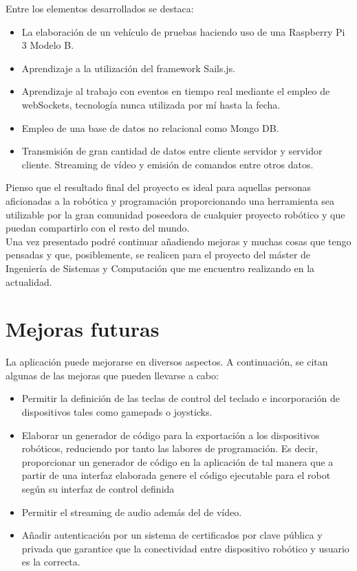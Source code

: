 Entre los elementos desarrollados se destaca:

\begin{itemize}
 \item La elaboración de un vehículo de pruebas haciendo uso de una Raspberry Pi 3 Modelo B.
 \item Aprendizaje a la utilización del framework Sails.js.
 \item Aprendizaje al trabajo con eventos en tiempo real mediante el empleo de webSockets, tecnología nunca utilizada por mí hasta la fecha.
 \item Empleo de una base de datos no relacional como Mongo DB.
 \item Transmisión de gran cantidad de datos entre cliente servidor y servidor cliente. Streaming de vídeo y emisión de comandos entre otros datos.\\
\end{itemize}


Pienso que el resultado final del proyecto es ideal para aquellas personas aficionadas a la robótica y programación proporcionando una herramienta sea utilizable por la gran comunidad poseedora 
de cualquier proyecto robótico y que puedan compartirlo con el resto del mundo.\\

Una vez presentado podré continuar añadiendo mejoras y muchas cosas que tengo pensadas y que, posiblemente, se realicen para el proyecto del máster de Ingeniería de Sistemas y Computación que me 
encuentro realizando en la actualidad.\\

\section{Mejoras futuras}

La aplicación puede mejorarse en diversos aspectos. A continuación, se citan algunas de las mejoras que pueden llevarse a cabo:

\begin{itemize}

\item Permitir la definición de las teclas de control del teclado e incorporación de dispositivos tales como gamepads o joysticks.

\item Elaborar un generador de código para la exportación a los dispositivos robóticos, reduciendo por tanto las labores de programación. Es decir, proporcionar un generador de código
en la aplicación de tal manera que a partir de una interfaz elaborada genere el código ejecutable para el robot según su interfaz de control definida\\

\item Permitir el streaming de audio además del de vídeo.\\

\item Añadir autenticación por un sistema de certificados por clave pública y privada que garantice que la conectividad entre dispositivo robótico y usuario es la correcta.\\

\end{itemize}
